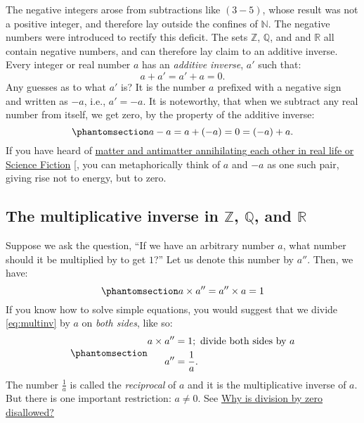 \documentclass[
  a4paper,
]{article}
\begin{document}
The negative integers arose from subtractions like \((3 - 5)\), whose
result was not a positive integer, and therefore lay outside the
confines of \(\mathbb{N}\). The negative numbers were introduced to
rectify this deficit. The sets \(\mathbb{Z}\), \(\mathbb{Q}\), and and
\(\mathbb{R}\) all contain negative numbers, and can therefore lay claim
to an additive inverse. Every integer or real number \(a\) has an
\emph{additive inverse}, \(a'\) such that: \[
a + a' = a' + a = 0.
\] Any guesses as to what \(a'\) is? It is the number \(a\) prefixed
with a negative sign and written as \(-a\), i.e., \(a' = -a\). It is
noteworthy, that when we subtract any real number from itself, we get
zero, by the property of the additive inverse:
\begin{equation}\phantomsection\label{eq:addinv}{
a - a = a + (-a) = 0 = (-a) + a.
}\end{equation} If you have heard of
\href{https://www.symmetrymagazine.org/article/september-2008/antimatters-science-fiction-debut?language_content_entity=und}{matter
and antimatter annihilating each other in real life or Science Fiction}
{[}\citeproc{ref-antimatter2008}{2}{]}, you can metaphorically think of
\(a\) and \(-a\) as one such pair, giving rise not to energy, but to
zero. \normalfont

\subsection{\texorpdfstring{The multiplicative inverse in
\(\mathbb{Z}\), \(\mathbb{Q}\), and
\(\mathbb{R}\)}{The multiplicative inverse in \textbackslash mathbb\{Z\}, \textbackslash mathbb\{Q\}, and \textbackslash mathbb\{R\}}}\label{the-multiplicative-inverse-in-mathbbz-mathbbq-and-mathbbr}

Suppose we ask the question, ``If we have an arbitrary number \(a\),
what number should it be multiplied by to get \(1\)?'' Let us denote
this number by \(a''\). Then, we have:
\begin{equation}\phantomsection\label{eq:multinv}{
a \times a'' = a'' \times a = 1
}\end{equation} If you know how to solve simple equations, you would
suggest that we divide \cref{eq:multinv} by \(a\) on \emph{both sides},
like so: \begin{equation}\phantomsection\label{eq:solve}{
\begin{aligned}
a \times a'' &= 1; \mbox{ divide both sides by } a\\
a'' &= \frac{1}{a}.
\end{aligned}
}\end{equation} The number \(\frac{1}{a}\) is called the
\emph{reciprocal} of \(a\) and it is the multiplicative inverse of
\(a\). But there is one important restriction: \(a \ne 0\). See
\hyperref[why-is-division-by-zero-disallowed]{Why is division by zero
disallowed?}
\end{document}

